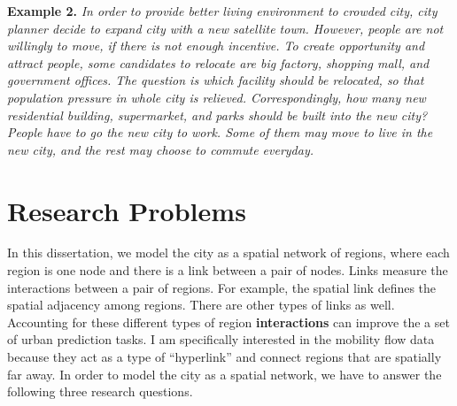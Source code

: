 \textbf{Example 2.} \emph{In order to provide better living environment to crowded city, city planner decide to expand city with a new satellite town. However, people are not willingly to move, if there is not enough incentive. To create opportunity and attract people, some candidates to relocate are big factory, shopping mall, and government offices. The question is which facility should be relocated, so that population pressure in whole  city  is relieved.  Correspondingly, how many new residential building, supermarket, and parks should be built into the new city? People have to go the new city to work. Some of them may move to live in the new city, and the rest may choose to commute everyday.}





\section{Research Problems}
\label{sec:qa}


In this dissertation, we model the city as a spatial network of regions, where each region is one node and there is a link between a pair of nodes. Links measure the interactions between a pair of regions. For example, the spatial link defines the spatial adjacency among regions. There are other types of links as well.  Accounting for these different types of region \textbf{interactions} can improve the a set of urban prediction tasks. I am specifically interested in the mobility flow data because they act as a type of ``hyperlink'' and connect regions that are spatially far away. In order to model the city as a spatial network, we have to answer the following three research questions.

